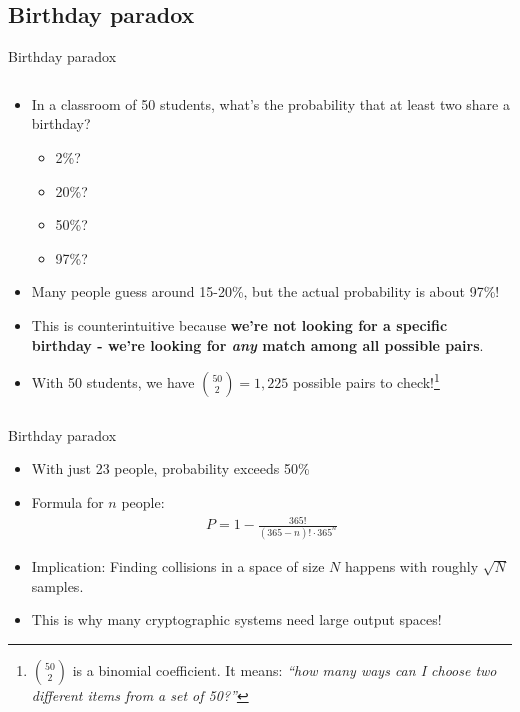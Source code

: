 \documentclass[aspectratio=169, lualatex, handout]{beamer}
\begin{document}
\subsection{Birthday paradox}

\begin{frame}{Birthday paradox}
	\begin{columns}[c]
		\begin{column}{1\textwidth}
			\begin{itemize}[<+->]
				\item In a classroom of 50 students, what's the probability that at least two share a birthday?
				      \begin{itemize}
					      \item 2\%?
					      \item 20\%?
					      \item 50\%?
					      \item 97\%?
				      \end{itemize}
				\item Many people guess around 15-20\%, but the actual probability is about 97\%!
				\item This is counterintuitive because \textbf{we're not looking for a specific birthday - we're looking for \textit{any} match among all possible pairs}.
				\item With 50 students, we have $\binom{50}{2} = 1,225$ possible pairs to check!\footnote{$\binom{50}{2}$ is a binomial coefficient. It means: \textit{``how many ways can I choose two different items from a set of 50?''}}
			\end{itemize}
		\end{column}
	\end{columns}
\end{frame}

\begin{frame}{Birthday paradox}
	\begin{itemize}
		\item With just 23 people, probability exceeds 50\%
		\item Formula for $n$ people:
		      \begin{align*}
			      P = 1 - \frac{365!}{(365-n)! \cdot 365^n}
		      \end{align*}
		\item Implication: Finding collisions in a space of size $N$ happens with roughly $\sqrt{N}$ samples.
		\item This is why many cryptographic systems need large output spaces!
	\end{itemize}
\end{frame}
\end{document}
